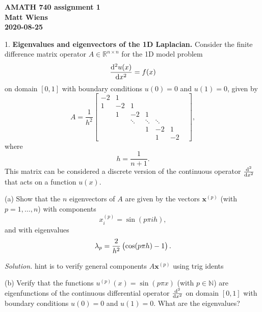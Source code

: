 \documentclass{article}
\def\*#1{\mathbf{#1}}
\newcommand{\N}{\mathbb{N}}
\newcommand{\R}{\mathbb{R}}
\begin{document}
\textbf{AMATH 740 assignment 1} \\
\textbf{Matt Wiens} \\
\textbf{2020-08-25}

1. \textbf{Eigenvalues and eigenvectors of the 1D Laplacian.}
Consider the finite difference matrix operator $A \in \R^{n \times n}$ for the 1D model problem
%
\begin{equation*}
    \dod[2]{u(x)}{x} = f(x)
\end{equation*}
%
on domain $[0, 1]$ with boundary conditions $u(0) = 0$ and $u(1) = 0$,
given by
%
\begin{equation*}
    A = \frac{1}{h^2}
        \begin{bmatrix}
            -2 & 1 & & & & & \\
            1 & -2 & 1 & & & \\
              & 1 & -2 & 1 & & \\
              & & \ddots & \ddots & \ddots & \\
              & & & 1 & -2 & 1 \\
              & & & & 1 & -2
         \end{bmatrix}
         ,
\end{equation*}
%
where
%
\begin{equation*}
    h = \frac{1}{n + 1}
    .
\end{equation*}
%
This matrix can be considered a discrete version of the continuous operator
$\od[2]{}{x}$ that acts on a function $u(x)$.

(a) Show that the $n$ eigenvectors of $A$ are given by the vectors
$\*x^{(p)}$ (with $p = 1, \ldots, n$) with components
%
\begin{equation*}
    x_i^{(p)} = \sin(p \pi i h),
\end{equation*}
%
and with eigenvalues
%
\begin{equation*}
    \lambda_p = \frac{2}{h^2} \del{\cos(p \pi h) - 1}
    .
\end{equation*}

\textit{Solution.}
hint is to verify general components $A \*x^{(p)}$ using trig idents

\vspace{5mm}

(b) Verify that the functions $u^{(p)}(x) = \sin(p \pi x)$ (with
$p \in \N$) are eigenfunctions of the continuous differential operator
$\od[2]{}{x}$ on domain $[0, 1]$ with boundary conditions
$u(0) = 0$ and $u(1) = 0$. What are the eigenvalues?
\end{document}

